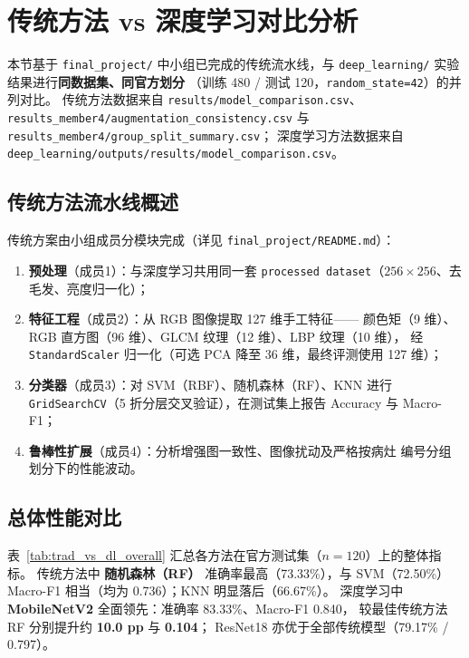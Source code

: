 \documentclass[12pt,a4paper]{ctexart}
\begin{document}
\section{传统方法 vs 深度学习对比分析}
\label{sec:trad_vs_dl}

本节基于 \texttt{final\_project/} 中小组已完成的传统流水线，与
\texttt{deep\_learning/} 实验结果进行\textbf{同数据集、同官方划分}
（训练 480 / 测试 120，\texttt{random\_state=42}）的并列对比。
传统方法数据来自 \texttt{results/model\_comparison.csv}、
\texttt{results\_member4/augmentation\_consistency.csv} 与
\texttt{results\_member4/group\_split\_summary.csv}；
深度学习方法数据来自 \texttt{deep\_learning/outputs/results/model\_comparison.csv}。

\subsection{传统方法流水线概述}

传统方案由小组成员分模块完成（详见 \texttt{final\_project/README.md}）：
\begin{enumerate}
  \item \textbf{预处理}（成员1）：与深度学习共用同一套
  \texttt{processed dataset}（$256\times256$、去毛发、亮度归一化）；
  \item \textbf{特征工程}（成员2）：从 RGB 图像提取 127 维手工特征——
  颜色矩（9 维）、RGB 直方图（96 维）、GLCM 纹理（12 维）、LBP 纹理（10 维），
  经 \texttt{StandardScaler} 归一化（可选 PCA 降至 36 维，最终评测使用 127 维）；
  \item \textbf{分类器}（成员3）：对 SVM（RBF）、随机森林（RF）、KNN 进行
  \texttt{GridSearchCV}（5 折分层交叉验证），在测试集上报告 Accuracy 与 Macro-F1；
  \item \textbf{鲁棒性扩展}（成员4）：分析增强图一致性、图像扰动及严格按病灶
  编号分组划分下的性能波动。
\end{enumerate}

\subsection{总体性能对比}

表~\ref{tab:trad_vs_dl_overall} 汇总各方法在官方测试集（$n=120$）上的整体指标。
传统方法中 \textbf{随机森林（RF）} 准确率最高（73.33\%），与 SVM（72.50\%）Macro-F1
相当（均为 0.736）；KNN 明显落后（66.67\%）。
深度学习中 \textbf{MobileNetV2} 全面领先：准确率 83.33\%、Macro-F1 0.840，
较最佳传统方法 RF 分别提升约 \textbf{10.0 pp} 与 \textbf{0.104}；
ResNet18 亦优于全部传统模型（79.17\% / 0.797）。
\end{document}
